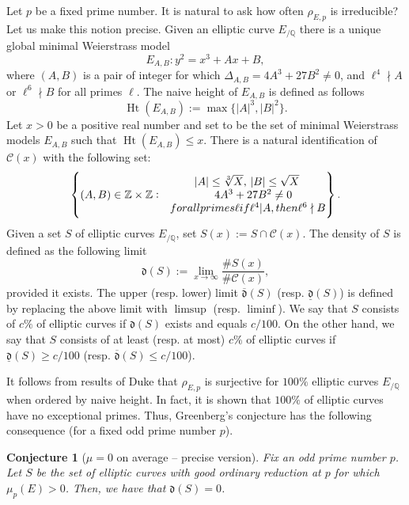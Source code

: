 \documentclass[12pt]{amsart}
\newtheorem{conjecture}[theorem]{Conjecture}
\newcommand{\Z}{\mathbb{Z}}
\newcommand{\Q}{\mathbb{Q}}
\newcommand{\cC}{\mathcal{C}}
\newcommand{\op}[1]{\operatorname{#1}}
\numberwithin{equation}{section}
\begin{document}
\par Let $p$ be a fixed prime number. It is natural to ask how often $\rho_{E,p}$ is irreducible? Let us make this notion precise. Given an elliptic curve $E_{/\Q}$ there is a unique global minimal Weierstrass model
\[E_{A,B}:y^2=x^3+Ax+B,\]
where $(A,B)$ is a pair of integer for which $\Delta_{A,B}=4A^3+27B^2\neq 0$, and $\ell^4\nmid A$ or $\ell^6\nmid B$ for all primes $\ell$. The naive height of $E_{A,B}$ is defined as follows
\[\op{Ht}(E_{A,B}):=\op{max}\{|A|^3, |B|^2\}.\]
Let $x>0$ be a positive real number and set to be the set of minimal Weierstrass models $E_{A,B}$ such that $\op{Ht}(E_{A,B})\leq x$. There is a natural identification of $\cC(x)$ with the following set: 
\[
\begin{Bmatrix}
 & \abs{A}\leq \sqrt[3]{X}, \ \abs{B}\leq \sqrt{X}\\
(A,B) \in \Z \times \Z: & \quad 4A^3 +27B^2 \neq 0 \\
& \textrm{for all primes } \ell \textrm{ if } \ell^4 |A, \textrm{then } \ell^6\nmid B 
\end{Bmatrix}.
\]
Given a set $S$ of elliptic curves $E_{/\Q}$, set $S(x):=S\cap \cC(x)$. The density of $S$ is defined as the following limit 
\[\mathfrak{d}(S):=\lim_{x\rightarrow \infty} \frac{\# S(x)}{\# \cC(x)},\] provided it exists. The upper (resp. lower) limit $\overline{\mathfrak{d}}(S)$ (resp. $\underline{\mathfrak{d}}(S)$) is defined by replacing the above limit with $\limsup$ (resp. $\liminf$). We say that $S$ consists of $c\%$ of elliptic curves if $\mathfrak{d}(S)$ exists and equals $c/100$. On the other hand, we say that $S$ consists of at least (resp. at most) $c \% $ of elliptic curves if $\underline{\mathfrak{d}}(S)\geq c/100$ (resp. $\overline{\mathfrak{d}}(S)\leq c/100$).



\par It follows from results of Duke \cite{Dukeexceptional} that $\rho_{E,p}$ is surjective for $100\%$ elliptic curves $E_{/\Q}$ when ordered by naive height. In fact, it is shown that $100\%$ of elliptic curves have no exceptional primes. Thus, Greenberg's conjecture has the following consequence (for a fixed odd prime number $p$).

\begin{conjecture}[$\mu=0$ on average -- precise version]\label{ detailed conjecture}
    Fix an odd prime number $p$. Let $S$ be the set of elliptic curves with good ordinary reduction at $p$ for which $\mu_p(E)>0$. Then, we have that $\mathfrak{d}(S)=0$. 
\end{conjecture}
\end{document}
